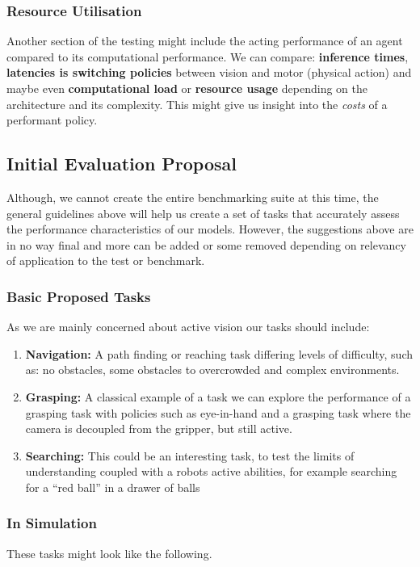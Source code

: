 \subsubsection{Resource Utilisation}
Another section of the testing might include the acting performance of an agent compared to its computational performance. We can compare: \textbf{inference times}, \textbf{latencies is switching policies} between vision and motor (physical action) and maybe even \textbf{computational load} or \textbf{resource usage} depending on the architecture and its complexity. This might give us insight into the \emph{costs} of a performant policy.

\subsection{Initial Evaluation Proposal}
Although, we cannot create the entire benchmarking suite at this time, the general guidelines above will help us create a set of tasks that accurately assess the performance characteristics of our models. However, the suggestions above are in no way final and more can be added or some removed depending on relevancy of application to the test or benchmark.

\subsubsection{Basic Proposed Tasks}
As we are mainly concerned about active vision our tasks should include:
\begin{enumerate}
  \item \textbf{Navigation:} A path finding or reaching task differing levels of difficulty, such as: no obstacles, some obstacles to overcrowded and complex environments.
  \item \textbf{Grasping:} A classical example of a task we can explore the performance of a grasping task with policies such as eye-in-hand and a grasping task where the camera is decoupled from the gripper, but still active.
  \item \textbf{Searching:} This could be an interesting task, to test the limits of understanding coupled with a robots active abilities, for example searching for a ``red ball'' in a drawer of balls
\end{enumerate}

\subsubsection{In Simulation}
These tasks might look like the following.
